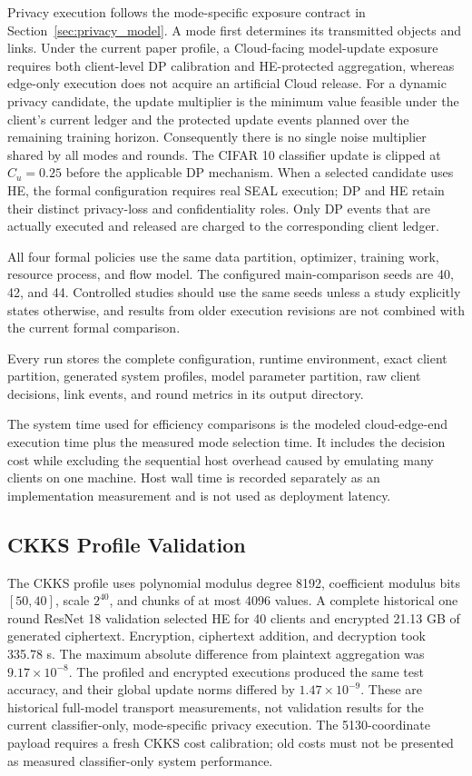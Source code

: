 \documentclass[5p,times]{elsarticle}
\theoremstyle{plain}
\theoremstyle{definition}
\theoremstyle{remark}
\begin{document}
Privacy execution follows the mode-specific exposure contract in
Section~\ref{sec:privacy_model}. A mode first determines its transmitted objects
and links. Under the current paper profile, a Cloud-facing model-update exposure
requires both client-level DP calibration and HE-protected aggregation, whereas
edge-only execution does not acquire an artificial Cloud release. For a dynamic
privacy candidate, the update multiplier is the minimum value feasible under the
client's current ledger and the protected update events planned over the remaining
training horizon. Consequently there is no single noise multiplier shared by all
modes and rounds. The CIFAR 10 classifier update is clipped at $C_u=0.25$ before
the applicable DP mechanism. When a selected candidate uses HE, the formal
configuration requires real SEAL execution; DP and HE retain their distinct
privacy-loss and confidentiality roles. Only DP events that are actually executed
and released are charged to the corresponding client ledger.

All four formal policies use the same data partition, optimizer, training work,
resource process, and flow model. The configured main-comparison seeds are 40,
42, and 44. Controlled studies should use the same seeds unless a study explicitly
states otherwise, and results from older execution revisions are not combined
with the current formal comparison.

Every run stores the complete configuration, runtime environment, exact client
partition, generated system profiles, model parameter partition, raw client
decisions, link events, and round metrics in its output directory.

The system time used for efficiency comparisons is the modeled cloud-edge-end
execution time plus the measured mode selection time. It includes the decision
cost while excluding the sequential host overhead caused by emulating many
clients on one machine. Host wall time is recorded separately as an
implementation measurement and is not used as deployment latency.

\subsection{CKKS Profile Validation}
\label{sec:ckks_validation}

The CKKS profile uses polynomial modulus degree 8192, coefficient modulus bits
\([50,40]\), scale \(2^{40}\), and chunks of at most 4096 values. A complete
historical one round ResNet 18 validation selected HE for 40 clients and encrypted 21.13 GB
of generated ciphertext. Encryption, ciphertext addition, and decryption took
335.78 s. The maximum absolute difference from plaintext aggregation was
\(9.17\times10^{-8}\). The profiled and encrypted executions produced the same
test accuracy, and their global update norms differed by
\(1.47\times10^{-9}\). These are historical full-model transport measurements, not validation results
for the current classifier-only, mode-specific privacy execution. The
5130-coordinate payload requires a fresh CKKS cost calibration; old costs must
not be presented as measured classifier-only system performance.
\end{document}
